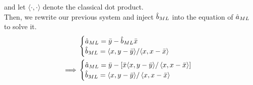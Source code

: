 \documentclass[12pt]{article}
\begin{document}
and let \(\langle \cdot, \cdot \rangle\) denote the classical dot product. \\
Then, we rewrite our previous system and inject \(\hat b_{ML}\) into the equation of \(\hat a_{ML}\) to solve it.
\begin{align*}
             &
    \begin{cases}
        \hat a_{ML} = \bar{y} - \hat b_{ML} \bar{x}                                                 \\
        \hat b_{ML} = \langle x, y-\bar{y}\rangle / {\left\langle x, x-\bar{x}\right\rangle} \\
    \end{cases} \\
    \implies &
    \begin{cases}
        \hat a_{ML} = \bar{y} - \left[\bar{x} \langle x, y-\bar{y}\rangle / \left\langle x, x-\bar{x}\right\rangle\right] \\
        \hat b_{ML} = \langle x, y-\bar{y}\rangle / \left\langle x, x-\bar{x}\right\rangle                                \\
    \end{cases} \\
\end{align*}
\end{document}
